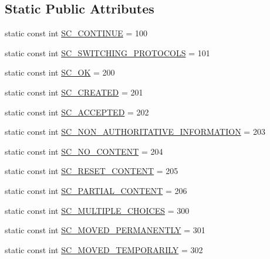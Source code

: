 \subsection*{Static Public Attributes}
\begin{DoxyCompactItemize}
\item 
static const int \hyperlink{class_c_w_f_1_1_http_servlet_response_a9eed2d26367e45b99468d96a00a75d79}{S\+C\+\_\+\+C\+O\+N\+T\+I\+N\+U\+E} = 100
\item 
static const int \hyperlink{class_c_w_f_1_1_http_servlet_response_ac07407cad835cda95c45f30a7126d745}{S\+C\+\_\+\+S\+W\+I\+T\+C\+H\+I\+N\+G\+\_\+\+P\+R\+O\+T\+O\+C\+O\+L\+S} = 101
\item 
static const int \hyperlink{class_c_w_f_1_1_http_servlet_response_a3b7b256cbe014b0a4a65c0e3e1436c81}{S\+C\+\_\+\+O\+K} = 200
\item 
static const int \hyperlink{class_c_w_f_1_1_http_servlet_response_aeb04e62ba36dc6c19270202ebd636402}{S\+C\+\_\+\+C\+R\+E\+A\+T\+E\+D} = 201
\item 
static const int \hyperlink{class_c_w_f_1_1_http_servlet_response_a66c8c74a4dff06c963c4bed1339e82a8}{S\+C\+\_\+\+A\+C\+C\+E\+P\+T\+E\+D} = 202
\item 
static const int \hyperlink{class_c_w_f_1_1_http_servlet_response_a5b617684845489bee4b7c3b73c1aebeb}{S\+C\+\_\+\+N\+O\+N\+\_\+\+A\+U\+T\+H\+O\+R\+I\+T\+A\+T\+I\+V\+E\+\_\+\+I\+N\+F\+O\+R\+M\+A\+T\+I\+O\+N} = 203
\item 
static const int \hyperlink{class_c_w_f_1_1_http_servlet_response_afe498f5d02ddf5fb32962658ed3e8e8d}{S\+C\+\_\+\+N\+O\+\_\+\+C\+O\+N\+T\+E\+N\+T} = 204
\item 
static const int \hyperlink{class_c_w_f_1_1_http_servlet_response_a90083f0dc1b999969cc0c52c3a94fd88}{S\+C\+\_\+\+R\+E\+S\+E\+T\+\_\+\+C\+O\+N\+T\+E\+N\+T} = 205
\item 
static const int \hyperlink{class_c_w_f_1_1_http_servlet_response_a6bb6146a2cdce18a525709f1c983cf46}{S\+C\+\_\+\+P\+A\+R\+T\+I\+A\+L\+\_\+\+C\+O\+N\+T\+E\+N\+T} = 206
\item 
static const int \hyperlink{class_c_w_f_1_1_http_servlet_response_a9d329691713f290b9fb86a12680edc57}{S\+C\+\_\+\+M\+U\+L\+T\+I\+P\+L\+E\+\_\+\+C\+H\+O\+I\+C\+E\+S} = 300
\item 
static const int \hyperlink{class_c_w_f_1_1_http_servlet_response_a1d3b0d0bcdea47e2cbcf872d4a3fbac6}{S\+C\+\_\+\+M\+O\+V\+E\+D\+\_\+\+P\+E\+R\+M\+A\+N\+E\+N\+T\+L\+Y} = 301
\item 
static const int \hyperlink{class_c_w_f_1_1_http_servlet_response_a9561af26ae9b74f8d9dda5d234df77d3}{S\+C\+\_\+\+M\+O\+V\+E\+D\+\_\+\+T\+E\+M\+P\+O\+R\+A\+R\+I\+L\+Y} = 302

\end{DoxyCompactItemize}
